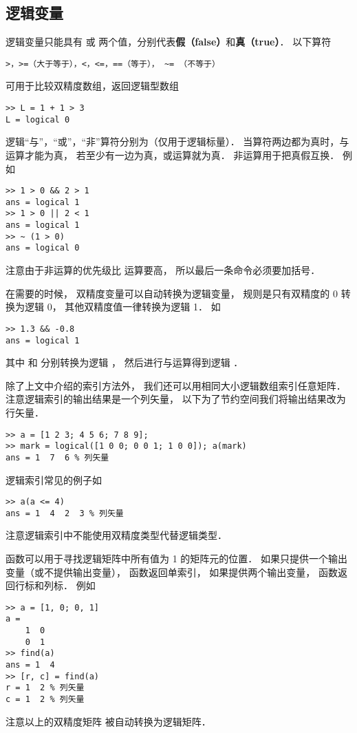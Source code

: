 \subsection{逻辑变量}

逻辑变量只能具有  或  两个值，分别代表\textbf{假（false）}和\textbf{真（true）}． 以下算符
\begin{lstlisting}[language=MatlabCom]
>，>=（大于等于），<，<=，==（等于）， ~= （不等于）
\end{lstlisting}
可用于比较双精度数组，返回逻辑型数组
\begin{lstlisting}[language=MatlabCom]
>> L = 1 + 1 > 3
L = logical 0
\end{lstlisting}

逻辑“与”，“或”，“非”算符分别为（仅用于逻辑标量）． 当算符两边都为真时，与运算才能为真， 若至少有一边为真，或运算就为真． 非运算用于把真假互换． 例如
\begin{lstlisting}[language=MatlabCom]
>> 1 > 0 && 2 > 1
ans = logical 1
>> 1 > 0 || 2 < 1
ans = logical 1
>> ~ (1 > 0)
ans = logical 0
\end{lstlisting}
注意由于非运算的优先级比 \x{>} 运算要高， 所以最后一条命令必须要加括号．

在需要的时候， 双精度变量可以自动转换为逻辑变量， 规则是只有双精度的 0 转换为逻辑 0， 其他双精度值一律转换为逻辑 1． 如
\begin{lstlisting}[language=MatlabCom]
>> 1.3 && -0.8
ans = logical 1
\end{lstlisting}
其中  和  分别转换为逻辑 ， 然后进行与运算得到逻辑 ．

除了上文中介绍的索引方法外， 我们还可以用相同大小逻辑数组索引任意矩阵． 注意逻辑索引的输出结果是一个列矢量， 以下为了节约空间我们将输出结果改为行矢量．
\begin{lstlisting}[language=MatlabCom]
>> a = [1 2 3; 4 5 6; 7 8 9];
>> mark = logical([1 0 0; 0 0 1; 1 0 0]); a(mark)
ans = 1  7  6 % 列矢量
\end{lstlisting}
逻辑索引常见的例子如
\begin{lstlisting}[language=MatlabCom]
>> a(a <= 4)
ans = 1  4  2  3 % 列矢量
\end{lstlisting}
注意逻辑索引中不能使用双精度类型代替逻辑类型．

 函数可以用于寻找逻辑矩阵中所有值为 1 的矩阵元的位置． 如果只提供一个输出变量（或不提供输出变量）， 函数返回单索引， 如果提供两个输出变量， 函数返回行标和列标． 例如
\begin{lstlisting}[language=MatlabCom]
>> a = [1, 0; 0, 1]
a =
    1  0
    0  1
>> find(a)
ans = 1  4
>> [r, c] = find(a)
r = 1  2 % 列矢量
c = 1  2 % 列矢量
\end{lstlisting}
注意以上的双精度矩阵  被自动转换为逻辑矩阵． 

